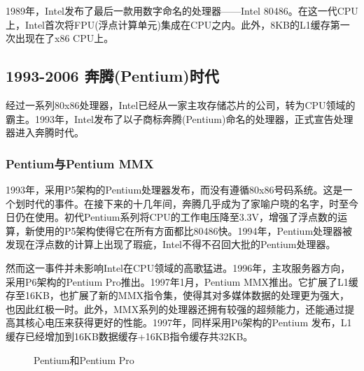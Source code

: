 \documentclass[UTF8]{ctexart}
\begin{document}
1989年，Intel发布了最后一款用数字命名的处理器——Intel 80486。在这一代CPU上，Intel首次将FPU(浮点计算单元)集成在CPU之内。此外，8KB的L1缓存第一次出现在了x86 CPU上。


\subsection{1993-2006 奔腾(Pentium)时代}
经过一系列80x86处理器，Intel已经从一家主攻存储芯片的公司，转为CPU领域的霸主。1993年，Intel发布了以子商标奔腾(Pentium)命名的处理器，正式宣告处理器进入奔腾时代。
\subsubsection{Pentium与Pentium MMX}
1993年，采用P5架构的Pentium处理器发布，而没有遵循80x86号码系统。这是一个划时代的事件。在接下来的十几年间，奔腾几乎成为了家喻户晓的名字，时至今日仍在使用。初代Pentium系列将CPU的工作电压降至3.3V，增强了浮点数的运算，新使用的P5架构使得它在所有方面都比80486快。1994年，Pentium处理器被发现在浮点数的计算上出现了瑕疵，Intel不得不召回大批的Pentium处理器。

然而这一事件并未影响Intel在CPU领域的高歌猛进。1996年，主攻服务器方向，采用P6架构的Pentium Pro推出。1997年1月，Pentium MMX推出。它扩展了L1缓存至16KB，也扩展了新的MMX指令集，使得其对多媒体数据的处理更为强大，也因此红极一时。此外，MMX系列的处理器还拥有较强的超频能力，还能通过提高其核心电压来获得更好的性能。1997年，同样采用P6架构的Pentium \uppercase\expandafter{}发布，L1缓存已经增加到16KB数据缓存+16KB指令缓存共32KB。
\begin{figure}[H]
    \centering
    \caption{Pentium和Pentium Pro}
\end{figure}
\end{document}

